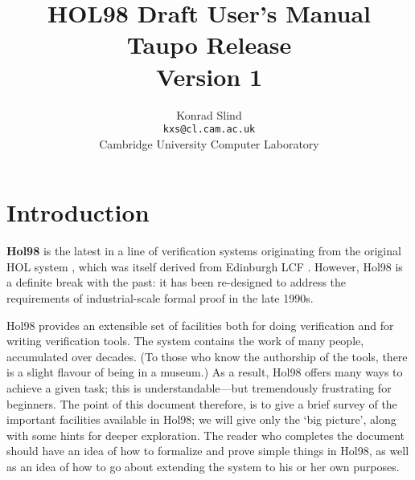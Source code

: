 \documentclass[12pt,fleqn,a4paper]{report}
\begin{document}
 \title {HOL98 Draft User's Manual \\ Taupo Release \\ Version 1}
 \author{Konrad Slind \\ {\tt kxs@cl.cam.ac.uk} \\
         Cambridge University Computer Laboratory}
 \maketitle

\begin{center}
\end{center}

\section*{Introduction}

 {\bf Hol98} is the latest in a line of verification systems originating
 from the original HOL system \cite{hol88:book}, which was itself
 derived from Edinburgh LCF \cite{lcf:book}. However, Hol98 is a
 definite break with the past: it has been re-designed to address the
 requirements of industrial-scale formal proof in the late 1990s.

 Hol98 provides an extensible set of facilities both for doing
 verification and for writing verification tools. The system contains the
 work of many people, accumulated over decades. (To those who know the
 authorship of the tools, there is a slight flavour of being in a
 museum.) As a result, Hol98 offers many ways to achieve a given task;
 this is understandable---but tremendously frustrating for beginners.
 The point of this document therefore, is to give a brief survey of the
 important facilities available in Hol98; we will give only the `big
 picture', along with some hints for deeper exploration. The reader who
 completes the document should have an idea of how to formalize and prove
 simple things in Hol98, as well as an idea of how to go about extending
 the system to his or her own purposes.
\end{document}
